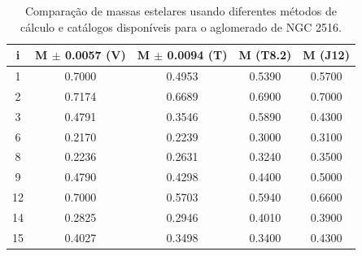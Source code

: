 \begin{table}[htbp]
\centering
\caption[Resultados de massas estelares para NGC 2516]{Comparação de massas estelares usando diferentes métodos de cálculo e catálogos disponíveis para o aglomerado de NGC 2516.}
\label{tab:ngc2516_massas}
\begin{tabular}{ccccc}
\hline
{i} & {M $\pm$ 0.0057 (V)} & {M $\pm$ 0.0094 (T)}  & {M (T8.2)} & {M (J12)} \\ \hline
        1   & 0.7000 & 0.4953 & 0.5390 & 0.5700 \\
		2   & 0.7174 & 0.6689 & 0.6900 & 0.7000 \\
		3   & 0.4791 & 0.3546 & 0.5890 & 0.4300 \\
		6   & 0.2170 & 0.2239 & 0.3000 & 0.3100 \\
		8   & 0.2236 & 0.2631 & 0.3240 & 0.3500 \\
		9   & 0.4790 & 0.4298 & 0.4400 & 0.5000 \\
		12  & 0.7000 & 0.5703 & 0.5940 & 0.6600 \\
		14  & 0.2825 & 0.2946 & 0.4010 & 0.3900 \\
		15  & 0.4027 & 0.3498 & 0.3400 & 0.4300 \\
        \hline
\end{tabular}
\end{table}
